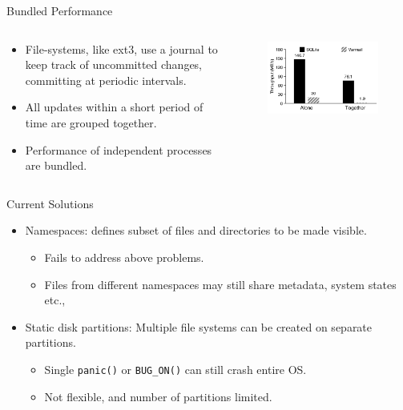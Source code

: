\documentclass[aspectratio=169]{beamer}
\newcommand{\bi}{\begin{itemize}}
\newcommand{\ei}{\end{itemize}}
\begin{document}
\begin{frame}{Bundled Performance}
    \begin{columns}[T]
        \begin{column}{0.4\textwidth}
            \bi
        \item File-systems, like ext3, use a journal to keep track of uncommitted changes,
            committing at periodic intervals.
        \item All updates within a short period of time are grouped together.
        \item Performance of independent processes are bundled.
            \ei
    \end{column}
    \begin{column}{0.2\textwidth}
        \pause
        \begin{figure}
            \includegraphics[scale=0.3]{./figures/fig2.png}
        \end{figure}
    \end{column}
\end{columns}
\end{frame}

\begin{frame}{Current Solutions}
    \bi
\item Namespaces: defines subset of files and directories to be made visible.
    \pause
    \bi
\item Fails to address above problems.
\item Files from different namespaces may still share metadata, system states
    etc.,
    \ei
\item Static disk partitions: Multiple file systems can be created on separate
    partitions.
    \pause
    \bi
\item Single \texttt{panic()} or \texttt{BUG\_ON()} can still crash entire OS.
\item Not flexible, and number of partitions limited.
    \ei
    \ei
\end{frame}
\end{document}
